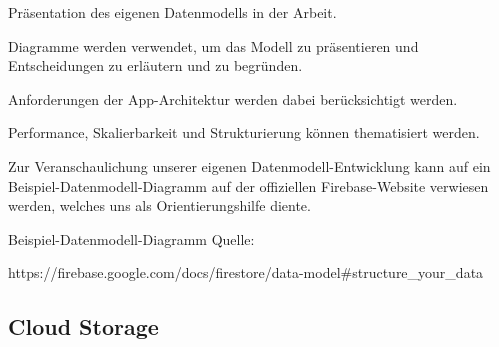 \begin{compactitem}
    \item Präsentation des eigenen Datenmodells in der Arbeit.
    \item Diagramme werden verwendet, um das Modell zu präsentieren und Entscheidungen zu erläutern und zu begründen.
    \item Anforderungen der App-Architektur werden dabei berücksichtigt werden.
    \item Performance, Skalierbarkeit und Strukturierung können thematisiert werden.
    \item Zur Veranschaulichung unserer eigenen Datenmodell-Entwicklung kann auf ein Beispiel-Datenmodell-Diagramm auf der offiziellen Firebase-Website verwiesen werden, welches uns als Orientierungshilfe diente.
\end{compactitem}

Beispiel-Datenmodell-Diagramm Quelle:

https://firebase.google.com/docs/firestore/data-model\#structure\_your\_data

\subsection{Cloud Storage}

